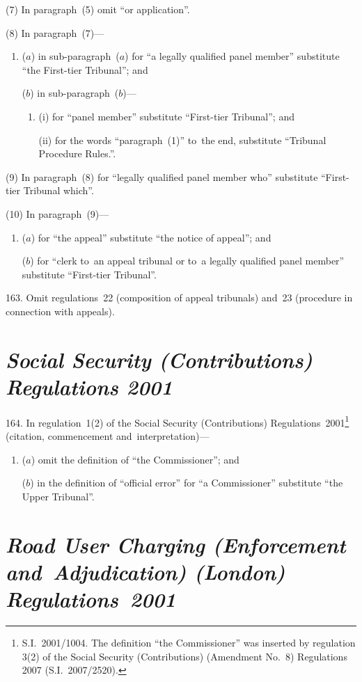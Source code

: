 \documentclass[12pt,a4paper]{article}
\begin{document}
(7) In paragraph~(5) omit “or application”.

(8) In paragraph~(7)—
\begin{enumerate}\item[]
($a$) in sub-paragraph~($a$)  for “a legally qualified panel member” substitute “the First-tier Tribunal”; and

($b$) in sub-paragraph~($b$)—
\begin{enumerate}\item[]
(i) for “panel member” substitute “First-tier Tribunal”; and

(ii) for the words “paragraph~(1)” to~the end, substitute “Tribunal Procedure Rules.”.
\end{enumerate}
\end{enumerate}

(9) In paragraph~(8) for “legally qualified panel member who” substitute “First-tier Tribunal which”.

(10) In paragraph~(9)—
\begin{enumerate}\item[]
($a$) for “the appeal” substitute “the notice of appeal”; and

($b$) for “clerk to~an appeal tribunal or to~a legally qualified panel member” substitute “First-tier Tribunal”.
\end{enumerate}

\medskip

163.  Omit regulations~22 (composition of appeal tribunals) and~23 (procedure in connection with appeals).

\section*{\itshape Social Security (Contributions) Regulations 2001}

164.  In regulation~1(2) of the Social Security (Contributions) Regulations~2001\footnote{S.I.~2001/1004. The definition “the Commissioner” was inserted by regulation 3(2) of the Social Security (Contributions) (Amendment No.~8) Regulations 2007 (S.I.~2007/2520).} (citation, commencement and~interpretation)—
\begin{enumerate}\item[]
($a$) omit the definition of “the Commissioner”; and

($b$) in the definition of “official error” for “a Commissioner” substitute “the Upper Tribunal”.
\end{enumerate}

\section*{\itshape Road User Charging (Enforcement and~Adjudication) (London) Regulations~2001}
\end{document}
